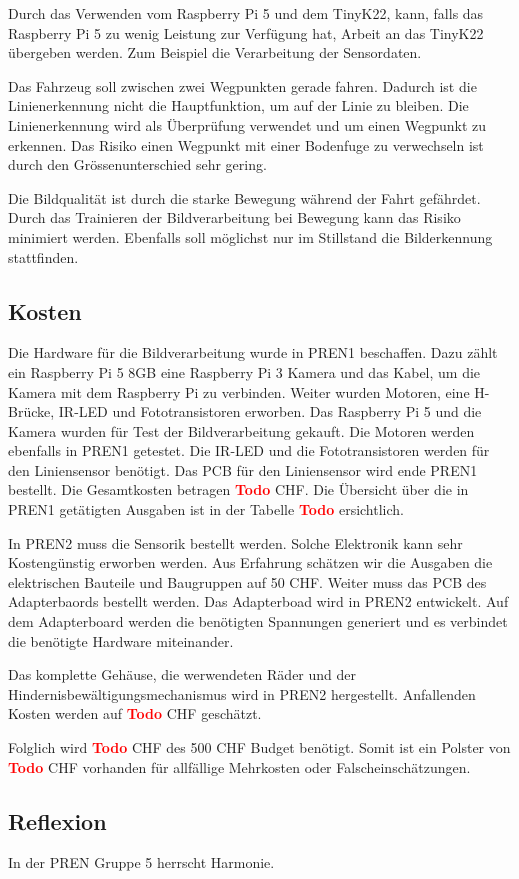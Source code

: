 \documentclass[../main.tex]{subfiles}
\begin{document}
Durch das Verwenden vom Raspberry Pi 5 und dem TinyK22, kann, falls das Raspberry Pi 5 zu wenig Leistung zur Verfügung hat, Arbeit an das TinyK22 übergeben werden. Zum Beispiel die Verarbeitung der Sensordaten. 

Das Fahrzeug soll zwischen zwei Wegpunkten gerade fahren. Dadurch ist die Linienerkennung nicht die Hauptfunktion, um auf der Linie zu bleiben. Die Linienerkennung wird als Überprüfung verwendet und um einen Wegpunkt zu erkennen. Das Risiko einen Wegpunkt mit einer Bodenfuge zu verwechseln ist durch den Grössenunterschied sehr gering. 

Die Bildqualität ist durch die starke Bewegung während der Fahrt gefährdet. Durch das Trainieren der Bildverarbeitung bei Bewegung kann das Risiko minimiert werden. Ebenfalls soll möglichst nur im Stillstand die Bilderkennung stattfinden. 

\subsection{Kosten}
Die Hardware für die Bildverarbeitung wurde in PREN1 beschaffen. Dazu zählt ein Raspberry Pi 5 8GB eine Raspberry Pi 3 Kamera und das Kabel, um die Kamera mit dem Raspberry Pi zu verbinden. Weiter wurden Motoren, eine H-Brücke, IR-LED und Fototransistoren erworben. Das Raspberry Pi 5 und die Kamera wurden für Test der Bildverarbeitung gekauft. Die Motoren werden ebenfalls in PREN1 getestet. Die IR-LED und die Fototransistoren werden für den Liniensensor benötigt. Das PCB für den Liniensensor wird ende PREN1 bestellt. Die Gesamtkosten betragen  \textcolor{red}{\textbf{Todo}} CHF. Die Übersicht über die in PREN1 getätigten Ausgaben ist in der Tabelle \textcolor{red}{\textbf{Todo}} ersichtlich. 

In PREN2 muss die Sensorik bestellt werden. Solche Elektronik kann sehr Kostengünstig erworben werden. Aus Erfahrung schätzen wir die Ausgaben die elektrischen Bauteile und Baugruppen auf 50 CHF. Weiter muss das PCB des Adapterbaords bestellt werden. Das Adapterboad wird in PREN2 entwickelt. Auf dem Adapterboard werden die benötigten Spannungen generiert und es verbindet die benötigte Hardware miteinander. 

Das komplette Gehäuse, die werwendeten Räder und der Hindernisbewältigungsmechanismus wird in PREN2 hergestellt. Anfallenden Kosten werden auf \textcolor{red}{\textbf{Todo}} CHF geschätzt.

Folglich wird \textcolor{red}{\textbf{Todo}} CHF des 500 CHF Budget benötigt. Somit ist ein Polster von \textcolor{red}{\textbf{Todo}} CHF vorhanden für allfällige Mehrkosten oder Falscheinschätzungen.

\subsection{Reflexion}

In der PREN Gruppe 5 herrscht Harmonie.
\end{document}
